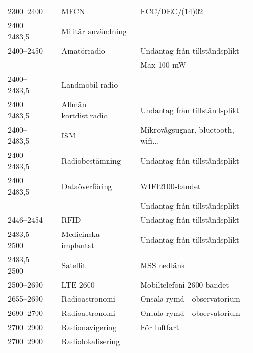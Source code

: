 \begin{landscape}
\begin{longtable}{llll}
	2300--2400         &                    & MFCN                    & ECC/DEC/(14)02                        \\
	2400--2483,5       &                    & Militär användning      &                                       \\
	2400--2450         &                    & Amatörradio             & Undantag från tillståndsplikt         \\
	                   &                    &                         & Max 100 mW                            \\
	2400--2483,5       &                    & Landmobil radio         &                                       \\
	2400--2483,5       &                    & Allmän kortdist.radio   & Undantag från tillståndsplikt         \\
	2400--2483,5       &                    & ISM                     & Mikrovågsugnar, bluetooth, wifi...    \\
	2400--2483,5       &                    & Radiobestämning         & Undantag från tillståndsplikt         \\
	2400--2483,5       &                    & Dataöverföring          & WIFI2100-bandet                       \\
	                   &                    &                         & Undantag från tillståndsplikt         \\
	2446--2454         &                    & RFID                    & Undantag från tillståndsplikt         \\
	2483,5--2500       &                    & Medicinska implantat    & Undantag från tillståndsplikt         \\
	2483,5--2500       &                    & Satellit                & MSS nedlänk                           \\
	2500--2690         &                    & LTE-2600                & Mobiltelefoni 2600-bandet             \\
	2655--2690         &                    & Radioastronomi          & Onsala rymd - observatorium           \\
	2690--2700         &                    & Radioastronomi          & Onsala rymd - observatorium           \\
	2700--2900         &                    & Radionavigering         & För luftfart                          \\
	2700--2900         &                    & Radiolokalisering       & 
\end{longtable}
\end{landscape}




